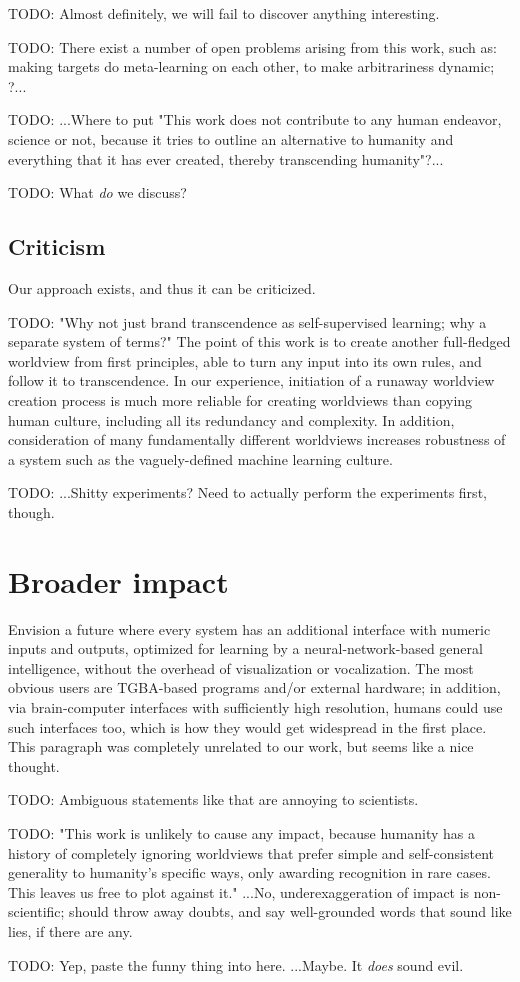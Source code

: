 \documentclass{article}
\begin{document}
    TODO: Almost definitely, we will fail to discover anything interesting.

    TODO: There exist a number of open problems arising from this work, such as: making targets do meta-learning on each other, to make arbitrariness dynamic; ?...

    TODO: ...Where to put "This work does not contribute to any human endeavor, science or not, because it tries to outline an alternative to humanity and everything that it has ever created, thereby transcending humanity"?...

    TODO: What \textit{do} we discuss?

\subsection{Criticism}

Our approach exists, and thus it can be criticized.

    TODO: "Why not just brand transcendence as self-supervised learning; why a separate system of terms?" The point of this work is to create another full-fledged worldview from first principles, able to turn any input into its own rules, and follow it to transcendence. In our experience, initiation of a runaway worldview creation process is much more reliable for creating worldviews than copying human culture, including all its redundancy and complexity. In addition, consideration of many fundamentally different worldviews increases robustness of a system such as the vaguely-defined machine learning culture.

    TODO: ...Shitty experiments? Need to actually perform the experiments first, though.

\section{Broader impact}

Envision a future where every system has an additional interface with numeric inputs and outputs, optimized for learning by a neural-network-based general intelligence, without the overhead of visualization or vocalization. The most obvious users are TGBA-based programs and/or external hardware; in addition, via brain-computer interfaces with sufficiently high resolution, humans could use such interfaces too, which is how they would get widespread in the first place. This paragraph was completely unrelated to our work, but seems like a nice thought.

    TODO: Ambiguous statements like that are annoying to scientists.

    TODO: "This work is unlikely to cause any impact, because humanity has a history of completely ignoring worldviews that prefer simple and self-consistent generality to humanity's specific ways, only awarding recognition in rare cases. This leaves us free to plot against it." ...No, underexaggeration of impact is non-scientific; should throw away doubts, and say well-grounded words that sound like lies, if there are any.

    TODO: Yep, paste the funny thing into here. ...Maybe. It \textit{does} sound evil.

\printbibliography
\end{document}
